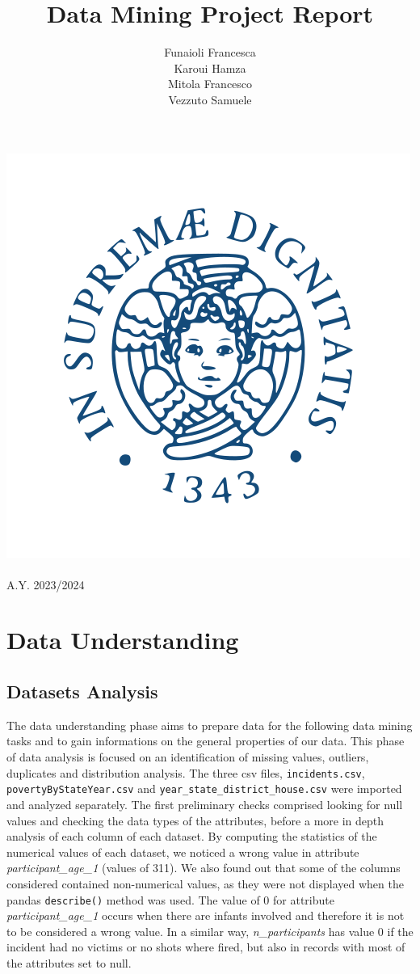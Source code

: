 \documentclass[10pt,a4paper]{report}
\title{\huge{\textbf{Data Mining Project Report}}}
\author{Funaioli Francesca\\
Karoui Hamza\\
Mitola Francesco\\
Vezzuto Samuele\\
}
\begin{document}
\makeatletter
\begin{titlepage}
	\begin{center}
		\includegraphics[width=0.4\linewidth]{unipi}\\[4ex]
		{\huge \bfseries  \@title }\\[2ex]
		{\Large A.Y. 2023/2024 }\\[6ex]
		{\large  \@author}
	\end{center}
\end{titlepage}
\makeatother

\tableofcontents

\chapter{Data Understanding}

\section{Datasets Analysis}

The data understanding phase aims to prepare data for the following data mining tasks and to gain informations on the general properties of our data.
This phase of data analysis is focused on an identification of missing values, outliers, duplicates and distribution analysis.
The three csv files, \texttt{incidents.csv}, \texttt{povertyByStateYear.csv} and \texttt{year\_state\_district\_house.csv} were imported and analyzed separately.
The first preliminary checks comprised looking for null values and checking the data types of the attributes, before a more in depth analysis of each column of each dataset.
By computing the statistics of the numerical values of each dataset, we noticed a wrong value in attribute \textit{participant\_age\_1} (values of 311).
We also found out that some of the columns considered contained non-numerical values, as they were not displayed when the pandas \texttt{describe()} method was used.
The value of 0 for attribute \textit{participant\_age\_1} occurs when there are infants involved and therefore it is not to be considered a wrong value.
In a similar way, \textit{n\_participants} has value 0 if the incident had no victims or no shots where fired, but also in records with most of the attributes set to null.
\end{document}
